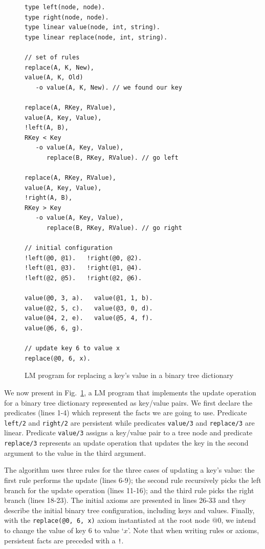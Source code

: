 \begin{figure}[t]
{\footnotesize
\begin{Verbatim}[numbers=right]
type left(node, node).
type right(node, node).
type linear value(node, int, string).
type linear replace(node, int, string).

// set of rules
replace(A, K, New),
value(A, K, Old)
   -o value(A, K, New). // we found our key

replace(A, RKey, RValue),
value(A, Key, Value),
!left(A, B),
RKey < Key
   -o value(A, Key, Value),
      replace(B, RKey, RValue). // go left

replace(A, RKey, RValue),
value(A, Key, Value),
!right(A, B),
RKey > Key
   -o value(A, Key, Value),
      replace(B, RKey, RValue). // go right

// initial configuration
!left(@0, @1).   !right(@0, @2).
!left(@1, @3).   !right(@1, @4). 
!left(@2, @5).   !right(@2, @6).

value(@0, 3, a).   value(@1, 1, b).
value(@2, 5, c).   value(@3, 0, d).
value(@4, 2, e).   value(@5, 4, f).
value(@6, 6, g).

// update key 6 to value x
replace(@0, 6, x).
\end{Verbatim}
}
\caption{LM program for replacing a key's value in a binary tree dictionary}
\label{code:btree_replace}
\end{figure}

We now present in Fig.~\ref{code:btree_replace}, a LM program that
implements the update operation for a binary tree dictionary
represented as key/value pairs. We first declare the predicates (lines
1-4) which represent the facts we are going to use. Predicate
\texttt{left/2} and \texttt{right/2} are persistent while predicates
\texttt{value/3} and \texttt{replace/3} are linear. Predicate
\texttt{value/3} assigns a key/value pair to a tree node and predicate
\texttt{replace/3} represents an update operation that updates the key
in the second argument to the value in the third argument.

The algorithm uses three rules for the three cases of updating a key's
value: the first rule performs the update (lines 6-9); the second rule
recursively picks the left branch for the update operation (lines
11-16); and the third rule picks the right branch (lines 18-23). The
initial axioms are presented in lines 26-33 and they describe the
initial binary tree configuration, including keys and values.
Finally, with the \texttt{replace(@0, 6, x)} axiom instantiated at the
root node $@0$, we intend to change the value of key 6 to value
`$x$'. Note that when writing rules or axioms, persistent facts are
preceded with a \texttt{!}.

